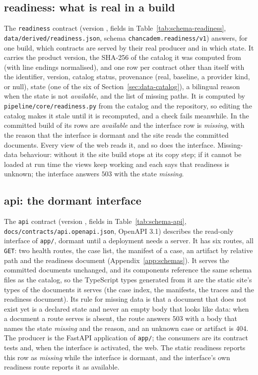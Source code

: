 \subsection{readiness: what is real in a build}\label{sec:data-readiness}

The \texttt{readiness} contract (version , fields in Table~\ref{tab:schema-readiness}, \texttt{data/\allowbreak{}derived/\allowbreak{}readiness.json}, schema \texttt{chancadem.readiness/\allowbreak{}v1})
answers, for one build, which contracts are served by their real producer and in which state. It carries the product version, the
SHA-256 of the catalog it was computed from (with line endings normalised), and one row per contract other than itself with the
identifier, version, catalog status, provenance (real, baseline, a provider kind, or null), state (one of the six of
Section~\ref{sec:data-catalog}), a bilingual reason when the state is not \emph{available}, and the list of missing paths. It is
computed by \texttt{pipeline/\allowbreak{}core/\allowbreak{}readiness.py} from the catalog and the repository, so editing the catalog makes it stale until it
is recomputed, and a check fails meanwhile. In the committed build \nreadyavail{} of its \nreadyrows{} rows are \emph{available} and the interface row is
\emph{missing}, with the reason that the interface is dormant and the site reads the committed documents. Every view of the web
reads it, and so does the interface. Missing-data behaviour: without it the site build stops at its copy step; if it cannot be
loaded at run time the views keep working and each says that readiness is unknown; the interface answers $503$ with the state
\emph{missing}.

\subsection{api: the dormant interface}\label{sec:data-api}

The \texttt{api} contract (version , fields in Table~\ref{tab:schema-api}, \texttt{docs/\allowbreak{}contracts/\allowbreak{}api.openapi.json}, OpenAPI 3.1) describes the read-only
interface of \texttt{app/\allowbreak{}}, dormant until a deployment needs a server. It has six routes, all \texttt{GET}: two health routes,
the case list, the manifest of a case, an artifact by relative path and the readiness document (Appendix~\ref{app:schemas}). It
serves the committed documents unchanged, and its components reference the same schema files as the catalog, so the TypeScript
types generated from it are the static site's types of the documents it serves (the case index, the manifests, the traces and
the readiness document). Its rule for missing data is that a document that does not exist yet is
a declared state and never an empty body that looks like data: when a document a route serves is absent, the route answers $503$
with a body that names the state \emph{missing} and the reason, and an unknown case or artifact is $404$. The producer is the
FastAPI application of \texttt{app/\allowbreak{}}; the consumers are its contract tests and, when the interface is activated, the web. The
static readiness reports this row as \emph{missing} while the interface is dormant, and the interface's own readiness route reports
it as available.
